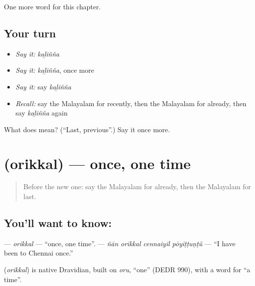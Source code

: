 \begin{grammarlens}[title={What you've built}]
One more word for this chapter.
\end{grammarlens}

\subsection*{Your turn}
\begin{itemize}
\raggedright
  \item \emph{Say it:} \emph{kaḻiñña}
  \item \emph{Say it:} \emph{kaḻiñña}, once more
  \item \emph{Say it:} say \emph{kaḻiñña}
  \item \emph{Recall:} say the Malayalam for recently, then the Malayalam for already, then say \emph{kaḻiñña} again
\end{itemize}

\begin{tcolorbox}[breakable,colback=teal!4,colframe=teal!35!black,title={Before you move on}]
What does  mean? (\textquotedblleft{}Last, previous\textquotedblright{}.) Say it once more.
\end{tcolorbox}
\section[\texorpdfstring{\ml{ഒരിക്കൽ} (orikkal)}{ഒരിക്കൽ (orikkal)}]{ (orikkal) — once, one time}

\label{lesson:ML-C178-orikkal}



\begin{quote}
Before the new one: say the Malayalam for already, then the Malayalam for last.
\end{quote}

\subsection*{You'll want to know: }
\textbf{} — \emph{orikkal} — \textquotedblleft{}once, one time\textquotedblright{}. \textbf{   } — \emph{ñān orikkal cennaiyil pōyiṭṭuṇṭŭ} — \textquotedblleft{}I have been to Chennai once.\textquotedblright{}

\begin{cousinweb}
\textbf{} (\emph{orikkal}) is native Dravidian, built on \emph{oru}, \textquotedblleft{}one\textquotedblright{} (DEDR 990), with a word for \textquotedblleft{}a time\textquotedblright{}.
\end{cousinweb}


